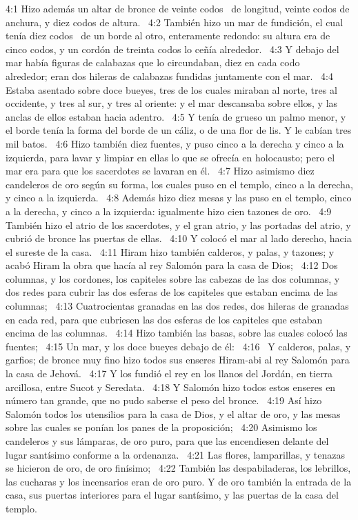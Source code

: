 				4:1 Hizo además un altar de bronce de veinte codos  de longitud, veinte codos de anchura, y diez codos de altura.  
				4:2 También hizo un mar de fundición, el cual tenía diez codos  de un borde al otro, enteramente redondo: su altura era de cinco codos, y un cordón de treinta codos lo ceñía alrededor.  
				4:3 Y debajo del mar había figuras de calabazas que lo circundaban, diez en cada codo   alrededor; eran dos hileras de calabazas fundidas juntamente con el mar.  
				4:4 Estaba asentado sobre doce bueyes, tres de los cuales miraban al norte, tres al occidente, y tres al sur, y tres al oriente: y el mar descansaba sobre ellos, y las anclas de ellos estaban hacia adentro.  
				4:5 Y tenía de grueso un palmo menor, y el borde tenía la forma del borde de un cáliz, o de una flor de lis. Y le cabían tres mil batos.  
				4:6 Hizo también diez fuentes, y puso cinco a la derecha y cinco a la izquierda, para lavar y limpiar en ellas lo que se ofrecía en holocausto; pero el mar era para que los sacerdotes se lavaran en él.  
				4:7 Hizo asimismo diez candeleros de oro según su forma, los cuales puso en el templo, cinco a la derecha, y cinco a la izquierda.  
				4:8 Además hizo diez mesas y las puso en el templo, cinco a la derecha, y cinco a la izquierda: igualmente hizo cien tazones de oro.  
				4:9 También hizo el atrio de los sacerdotes, y el gran atrio, y las portadas del atrio, y cubrió de bronce las puertas de ellas.  
				4:10 Y colocó el mar al lado derecho, hacia el sureste de la casa.  
				4:11 Hiram hizo también calderos, y palas, y tazones; y acabó Hiram la obra que hacía al rey Salomón para la casa de Dios;  
				4:12 Dos columnas, y los cordones, los capiteles sobre las cabezas de las dos columnas, y dos redes para cubrir las dos esferas de los capiteles que estaban encima de las columnas;  
				4:13 Cuatrocientas granadas en las dos redes, dos hileras de granadas en cada red, para que cubriesen las dos esferas de los capiteles que estaban encima de las columnas.  
				4:14 Hizo también las basas, sobre las cuales colocó las fuentes;  
				4:15 Un mar, y los doce bueyes debajo de él:  
				4:16  Y calderos, palas, y garfios; de bronce muy fino hizo todos sus enseres Hiram-abi al rey Salomón para la casa de Jehová.  
				4:17 Y los fundió el rey en los llanos del Jordán, en tierra arcillosa, entre Sucot y Seredata.  
				4:18 Y Salomón hizo todos estos enseres en número tan grande, que no pudo saberse el peso del bronce.  
				4:19 Así hizo Salomón todos los utensilios para la casa de Dios, y el altar de oro, y las mesas sobre las cuales se ponían los panes de la proposición;  
				4:20 Asimismo los candeleros y sus lámparas, de oro puro, para que las encendiesen delante del lugar santísimo conforme a la ordenanza.  
				4:21 Las flores, lamparillas, y tenazas se hicieron de oro, de oro finísimo;  
				4:22 También las despabiladeras, los lebrillos, las cucharas y los incensarios eran de oro puro. Y de oro también la entrada de la casa, sus puertas interiores para el lugar santísimo, y las puertas de la casa del templo.  
